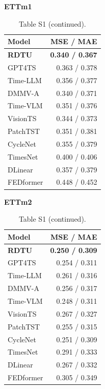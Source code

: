 \begin{table}[H]\centering\small
\caption*{Table S1 (continued).}
\begin{minipage}[t]{0.48\linewidth}\vspace{0pt}\centering\small
\textbf{ETTm1}\par\smallskip
\begin{tabular}{lr}\toprule Model & MSE / MAE\\\midrule
\rowcolor{blue!5}
\textbf{RDTU} & \textbf{0.340 / 0.367}\\
GPT4TS & 0.363 / 0.378\\
Time-LLM & 0.356 / 0.377\\
DMMV-A & 0.340 / 0.371\\
Time-VLM & 0.351 / 0.376\\
VisionTS & 0.344 / 0.373\\
PatchTST & 0.351 / 0.381\\
CycleNet & 0.355 / 0.379\\
TimesNet & 0.400 / 0.406\\
DLinear & 0.357 / 0.379\\
FEDformer & 0.448 / 0.452\\
\bottomrule\end{tabular}\end{minipage}\hfill\begin{minipage}[t]{0.48\linewidth}\vspace{0pt}\centering\small
\textbf{ETTm2}\par\smallskip
\begin{tabular}{lr}\toprule Model & MSE / MAE\\\midrule
\rowcolor{blue!5}
\textbf{RDTU} & \textbf{0.250 / 0.309}\\
GPT4TS & 0.254 / 0.311\\
Time-LLM & 0.261 / 0.316\\
DMMV-A & 0.256 / 0.317\\
Time-VLM & 0.248 / 0.311\\
VisionTS & 0.267 / 0.327\\
PatchTST & 0.255 / 0.315\\
CycleNet & 0.251 / 0.309\\
TimesNet & 0.291 / 0.333\\
DLinear & 0.267 / 0.332\\
FEDformer & 0.305 / 0.349\\
\bottomrule\end{tabular}\end{minipage}
\end{table}

